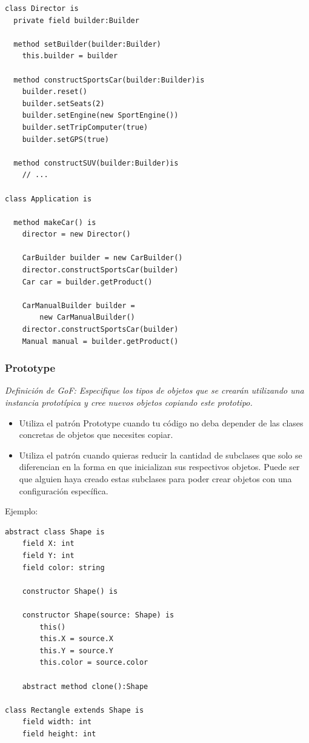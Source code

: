 \documentclass{article}
\begin{document}
\begin{multicols}{2}
\begin{verbatim}
class Director is
  private field builder:Builder

  method setBuilder(builder:Builder)
    this.builder = builder

  method constructSportsCar(builder:Builder)is
    builder.reset()
    builder.setSeats(2)
    builder.setEngine(new SportEngine())
    builder.setTripComputer(true)
    builder.setGPS(true)

  method constructSUV(builder:Builder)is
    // ...

class Application is

  method makeCar() is
    director = new Director()

    CarBuilder builder = new CarBuilder()
    director.constructSportsCar(builder)
    Car car = builder.getProduct()

    CarManualBuilder builder = 
        new CarManualBuilder()
    director.constructSportsCar(builder)
    Manual manual = builder.getProduct()
\end{verbatim}

\subsubsection{Prototype}
\textit{Definición de GoF: Especifique los tipos de objetos que se crearán utilizando una instancia prototípica y cree nuevos objetos copiando este prototipo.}
\begin{itemize}
    \item Utiliza el patrón Prototype cuando tu código no deba depender de las clases concretas de objetos que necesites copiar.
    \item Utiliza el patrón cuando quieras reducir la cantidad de subclases que solo se diferencian en la forma en que inicializan sus respectivos objetos. Puede ser que alguien haya creado estas subclases para poder crear objetos con una configuración específica.
\end{itemize}
Ejemplo:
\begin{verbatim}
abstract class Shape is
    field X: int
    field Y: int
    field color: string

    constructor Shape() is
        
    constructor Shape(source: Shape) is
        this()
        this.X = source.X
        this.Y = source.Y
        this.color = source.color

    abstract method clone():Shape

class Rectangle extends Shape is
    field width: int
    field height: int


\end{verbatim}
\end{multicols}
\end{document}
